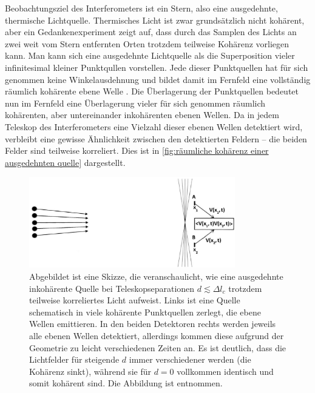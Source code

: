 Beobachtungsziel des Interferometers ist ein Stern, also eine ausgedehnte, thermische Lichtquelle. 
Thermisches Licht ist zwar grundsätzlich nicht kohärent, aber ein Gedankenexperiment zeigt auf, dass durch das Samplen des Lichts an zwei weit vom Stern entfernten Orten trotzdem teilweise Kohärenz vorliegen kann. 
Man kann sich eine ausgedehnte Lichtquelle als die Superposition vieler infinitesimal kleiner Punktqullen vorstellen. 
Jede dieser Punktquellen hat für sich genommen keine Winkelausdehnung und bildet damit im Fernfeld eine vollständig räumlich kohärente ebene Welle \cite[Kap. 6.1]{foxQuantumOpticsIntroduction2006}. 
Die Überlagerung der Punktquellen bedeutet nun im Fernfeld eine Überlagerung vieler für sich genommen räumlich kohärenten, aber untereinander inkohärenten ebenen Wellen. 
Da in jedem Teleskop des Interferometers eine Vielzahl dieser ebenen Wellen detektiert wird, verbleibt eine gewisse Ähnlichkeit zwischen den detektierten Feldern -- die beiden Felder sind teilweise korreliert. 
Dies ist in \autoref{fig:räumliche kohärenz einer ausgedehnten quelle} dargestellt. 
\begin{figure}[h]
    \centering
    \includegraphics[width=0.8\textwidth]{images/Theorie/Burke_9.25.png}
    \caption{Abgebildet ist eine Skizze, die veranschaulicht, wie eine ausgedehnte inkohärente Quelle bei Teleskopseparationen $d\lesssim\Delta l_c$ trotzdem teilweise korreliertes Licht aufweist. Links ist eine Quelle schematisch in viele kohärente Punktquellen zerlegt, die ebene Wellen emittieren. In den beiden Detektoren rechts werden jeweils alle ebenen Wellen detektiert, allerdings kommen diese aufgrund der Geometrie zu leicht verschiedenen Zeiten an. Es ist deutlich, dass die Lichtfelder für steigende $d$ immer verschiedener werden (die Kohärenz sinkt), während sie für $d=0$ vollkommen identisch und somit kohärent sind. Die Abbildung ist \cite[Fig. 9.25]{burkeIntroductionRadioAstronomy2019} entnommen.}
    \label{fig:räumliche kohärenz einer ausgedehnten quelle}
\end{figure}
